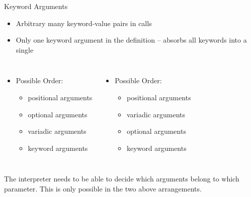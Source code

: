 \begin{frame}{Keyword Arguments}
%
\begin{itemize}
\item Arbitrary many keyword-value pairs in calls
\item Only one keyword argument in the definition -- absorbs all keywords into a single 
\end{itemize}
%
\begin{columns}[T]
\begin{itemize}
\item Possible Order:
	\begin{itemize}
	\item positional arguments
	\item optional arguments
	\item variadic arguments
	\item keyword arguments
	\end{itemize}
\end{itemize}
%
\begin{itemize}
\item Possible Order:
	\begin{itemize}
	\item positional arguments
	\item variadic arguments
	\item optional arguments
	\item keyword arguments
	\end{itemize}
\end{itemize}
\end{columns}
%
\vspace{6pt}
\begin{hintbox}
The interpreter needs to be able to decide which arguments belong to which parameter. This is only possible in the two above arrangements.
\end{hintbox}
%
\end{frame}


